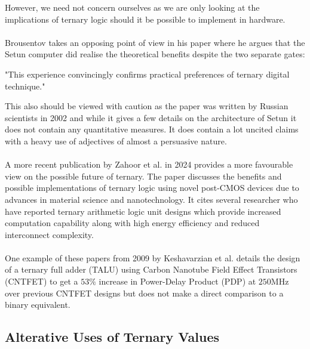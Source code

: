 \documentclass[12pt]{article}
\begin{document}
However, we need not concern ourselves as we are only looking at the implications of ternary logic should it be possible 
to implement in hardware.\\
\\
Brousentov takes an opposing point of view in his paper where he argues that the Setun computer did realise the theoretical 
benefits despite the two separate gates:
\begin{displayquote}
    "This experience convincingly confirms practical preferences of ternary digital technique."
\end{displayquote}
This also should be viewed with caution as the paper was written by Russian scientists in 2002 and while it gives a few details on the 
architecture of Setun it does not contain any quantitative measures. It does contain a lot uncited claims with a heavy use of adjectives of 
almost a persuasive nature.\\
\\
A more recent publication by Zahoor et al. in 2024 provides a more favourable view on the possible future of ternary. 
The paper discusses the benefits and possible implementations of ternary logic using novel post-CMOS devices due to advances in 
material science and nanotechnology. It cites several researcher who have reported ternary arithmetic logic unit designs which 
provide increased computation capability along with high energy efficiency and reduced interconnect complexity.\\
\\
One example of these papers from 2009 by Keshavarzian et al. details the design of a ternary full adder (TALU) 
using Carbon Nanotube Field Effect Transistors (CNTFET) to get a $53\%$ increase in Power-Delay Product (PDP) 
at $250$MHz over previous CNTFET designs but does not make a direct comparison to a binary equivalent.\\

\subsection{Alterative Uses of Ternary Values}
\end{document}
